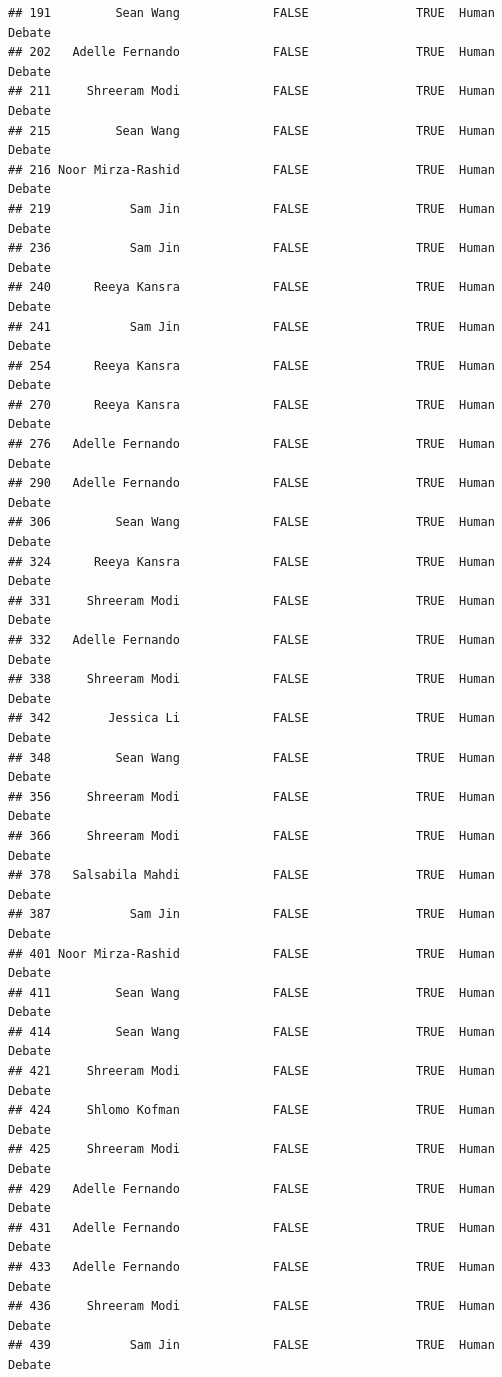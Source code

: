 \documentclass[
]{article}
\begin{document}
\begin{verbatim}
## 191         Sean Wang             FALSE               TRUE  Human Debate
## 202   Adelle Fernando             FALSE               TRUE  Human Debate
## 211     Shreeram Modi             FALSE               TRUE  Human Debate
## 215         Sean Wang             FALSE               TRUE  Human Debate
## 216 Noor Mirza-Rashid             FALSE               TRUE  Human Debate
## 219           Sam Jin             FALSE               TRUE  Human Debate
## 236           Sam Jin             FALSE               TRUE  Human Debate
## 240      Reeya Kansra             FALSE               TRUE  Human Debate
## 241           Sam Jin             FALSE               TRUE  Human Debate
## 254      Reeya Kansra             FALSE               TRUE  Human Debate
## 270      Reeya Kansra             FALSE               TRUE  Human Debate
## 276   Adelle Fernando             FALSE               TRUE  Human Debate
## 290   Adelle Fernando             FALSE               TRUE  Human Debate
## 306         Sean Wang             FALSE               TRUE  Human Debate
## 324      Reeya Kansra             FALSE               TRUE  Human Debate
## 331     Shreeram Modi             FALSE               TRUE  Human Debate
## 332   Adelle Fernando             FALSE               TRUE  Human Debate
## 338     Shreeram Modi             FALSE               TRUE  Human Debate
## 342        Jessica Li             FALSE               TRUE  Human Debate
## 348         Sean Wang             FALSE               TRUE  Human Debate
## 356     Shreeram Modi             FALSE               TRUE  Human Debate
## 366     Shreeram Modi             FALSE               TRUE  Human Debate
## 378   Salsabila Mahdi             FALSE               TRUE  Human Debate
## 387           Sam Jin             FALSE               TRUE  Human Debate
## 401 Noor Mirza-Rashid             FALSE               TRUE  Human Debate
## 411         Sean Wang             FALSE               TRUE  Human Debate
## 414         Sean Wang             FALSE               TRUE  Human Debate
## 421     Shreeram Modi             FALSE               TRUE  Human Debate
## 424     Shlomo Kofman             FALSE               TRUE  Human Debate
## 425     Shreeram Modi             FALSE               TRUE  Human Debate
## 429   Adelle Fernando             FALSE               TRUE  Human Debate
## 431   Adelle Fernando             FALSE               TRUE  Human Debate
## 433   Adelle Fernando             FALSE               TRUE  Human Debate
## 436     Shreeram Modi             FALSE               TRUE  Human Debate
## 439           Sam Jin             FALSE               TRUE  Human Debate

\end{verbatim}
\end{document}

